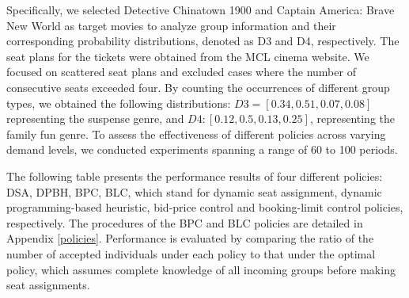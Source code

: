 Specifically, we selected Detective Chinatown 1900 and Captain America: Brave New World as target movies to analyze group information and their corresponding probability distributions, denoted as D3 and D4, respectively. The seat plans for the tickets were obtained from the MCL cinema website. We focused on scattered seat plans and excluded cases where the number of consecutive seats exceeded four. By counting the occurrences of different group types, we obtained the following distributions: $D3 = [0.34, 0.51, 0.07, 0.08]$ representing the suspense genre, and $D4: [0.12, 0.5, 0.13, 0.25]$, representing the family fun genre. To assess the effectiveness of different policies across varying demand levels, we conducted experiments spanning a range of 60 to 100 periods. 


The following table presents the performance results of four different policies: DSA, DPBH, BPC, BLC, which stand for dynamic seat assignment, dynamic programming-based heuristic, bid-price control and booking-limit control policies, respectively. The procedures of the BPC and BLC policies are detailed in Appendix \ref{policies}. Performance is evaluated by comparing the ratio of the number of accepted individuals under each policy to that under the optimal policy, which assumes complete knowledge of all incoming groups before making seat assignments.

